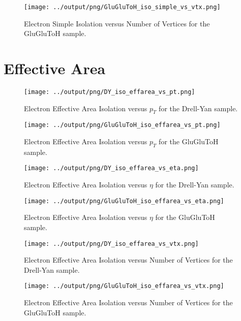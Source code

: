 \documentclass[11pt]{book}
\begin{document}
\begin{figure}[htb]
\centering
\texttt{[image: ../output/png/GluGluToH\_iso\_simple\_vs\_vtx.png]}
\caption{Electron Simple Isolation versus Number of Vertices for the GluGluToH sample.}
\label{fig:ggh_iso_simple_vs_vtx}
\end{figure}
\clearpage

\section{Effective Area}

\begin{figure}[htb]
\centering
\texttt{[image: ../output/png/DY\_iso\_effarea\_vs\_pt.png]}
\caption{Electron Effective Area Isolation versus $p_{T}$ for the Drell-Yan sample.}
\label{fig:dy_iso_effarea_vs_pt}
\end{figure}

\begin{figure}[htb]
\centering
\texttt{[image: ../output/png/GluGluToH\_iso\_effarea\_vs\_pt.png]}
\caption{Electron Effective Area Isolation versus $p_{T}$ for the GluGluToH sample.}
\label{fig:ggh_iso_effarea_vs_pt}
\end{figure}

\begin{figure}[htb]
\centering
\texttt{[image: ../output/png/DY\_iso\_effarea\_vs\_eta.png]}
\caption{Electron Effective Area Isolation versus $\eta$ for the Drell-Yan sample.}
\label{fig:dy_iso_effarea_vs_eta}
\end{figure}

\begin{figure}[htb]
\centering
\texttt{[image: ../output/png/GluGluToH\_iso\_effarea\_vs\_eta.png]}
\caption{Electron Effective Area Isolation versus $\eta$ for the GluGluToH sample.}
\label{fig:ggh_iso_effarea_vs_eta}
\end{figure}

\begin{figure}[htb]
\centering
\texttt{[image: ../output/png/DY\_iso\_effarea\_vs\_vtx.png]}
\caption{Electron Effective Area Isolation versus Number of Vertices for the Drell-Yan sample.}
\label{fig:dy_iso_effarea_vs_vtx}
\end{figure}

\begin{figure}[htb]
\centering
\texttt{[image: ../output/png/GluGluToH\_iso\_effarea\_vs\_vtx.png]}
\caption{Electron Effective Area Isolation versus Number of Vertices for the GluGluToH sample.}
\label{fig:ggh_iso_effarea_vs_vtx}
\end{figure}
\clearpage
\end{document}

